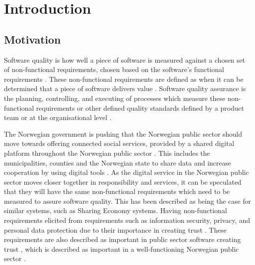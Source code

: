 \chapter{Introduction}

\section{Motivation} \label{sec:motivation}

Software quality is how well a piece of software is measured against a chosen set of non-functional requirements, chosen based on the software's functional requirements \cite{iso_25010:2011}. These non-functional requirements are defined as when it can be determined that a piece of software delivers value \cite{iso_25010:2011}. Software quality assurance is the planning, controlling, and executing of processes which measure these non-functional requirements or other defined quality standards defined by a product team or at the organisational level \cite{ieee_730_2014}\cite{sqa_wiki_2023}. 



The Norwegian government is pushing that the Norwegian public sector should move towards offering connected social services, provided by a shared digital platform throughout the Norwegian public sector \cite{r_2019}. This includes the municipalities, counties and the Norwegian state to share data and increase cooperation by using digital tools \cite{r_2019}. As the digital service in the Norwegian public sector moves closer together in responsibility and services, it can be speculated that they will have the same non-functional requirements which need to be measured to assure software quality. This has been described as being the case for similar systems, such as Sharing Economy systems. Having non-functional requirements elicited from requirements such as information security, privacy, and personal data protection due to their importance in creating trust \cite{is_2019}. These requirements are also described as important in public sector software creating trust \cite{la_2017}, which is described as important in a well-functioning Norwegian public sector \cite{oecd_2022}.

